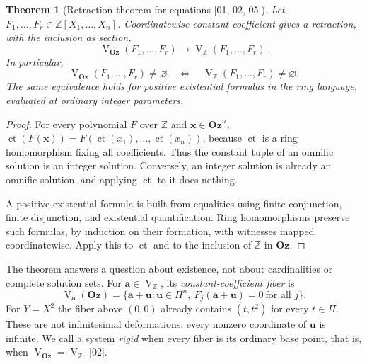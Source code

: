 \documentclass[11pt,oneside]{article}
\numberwithin{equation}{section}
\newtheorem{theorem}{Theorem}[section]
\theoremstyle{definition}
\theoremstyle{remark}
\newcommand{\Oz}{\mathbf{Oz}}
\newcommand{\Z}{\mathbb Z}
\newcommand{\ct}{\operatorname{ct}}
\newcommand{\V}{\operatorname V}
\newcommand{\src}[1]{\textup{\textsf{\small[#1]}}}
\begin{document}
\begin{theorem}[Retraction theorem for equations \src{01, 02, 05}]\label{odg:thm:transfer}
Let $F_1,\ldots,F_r\in\Z[X_1,\ldots,X_n]$. Coordinatewise constant
coefficient gives a retraction, with the inclusion as section,
\[
 \V_{\Oz}(F_1,\ldots,F_r)\longrightarrow
 \V_\Z(F_1,\ldots,F_r).
\]
In particular,
\begin{equation}\label{odg:eq:existencetransfer}
 \V_{\Oz}(F_1,\ldots,F_r)\ne\varnothing
 \quad\Longleftrightarrow\quad
 \V_\Z(F_1,\ldots,F_r)\ne\varnothing.
\end{equation}
The same equivalence holds for positive existential formulas in the ring
language, evaluated at ordinary integer parameters.
\end{theorem}
\begin{proof}
For every polynomial $F$ over $\Z$ and $\mathbf x\in\Oz^n$,
$\ct(F(\mathbf x))=F(\ct(x_1),\ldots,\ct(x_n))$, because $\ct$ is a ring
homomorphism fixing all coefficients. Thus the constant tuple of an omnific
solution is an integer solution. Conversely, an integer solution is already
an omnific solution, and applying $\ct$ to it does nothing.

A positive existential formula is built from equalities using finite
conjunction, finite disjunction, and existential quantification. Ring
homomorphisms preserve such formulas, by induction on their formation, with
witnesses mapped coordinatewise. Apply this to $\ct$ and to the inclusion of
$\Z$ in $\Oz$.
\end{proof}

The theorem answers a question about existence, not about cardinalities or
complete solution sets. For $\mathbf a\in\V_\Z$, its
\emph{constant-coefficient fiber} is
\begin{equation}\label{odg:eq:fiber}
 \V_{\mathbf a}(\Oz)=\{\mathbf a+\mathbf u:\mathbf u\in\Pi^n,\
 F_j(\mathbf a+\mathbf u)=0\ \text{for all }j\}.
\end{equation}
For $Y=X^2$ the fiber above $(0,0)$ already contains $(t,t^2)$ for every
$t\in\Pi$. These are not infinitesimal deformations: every nonzero coordinate
of $\mathbf u$ is infinite. We call a system \emph{rigid} when every fiber is
its ordinary base point, that is, when $\V_{\Oz}=\V_\Z$ \src{02}.
\end{document}
